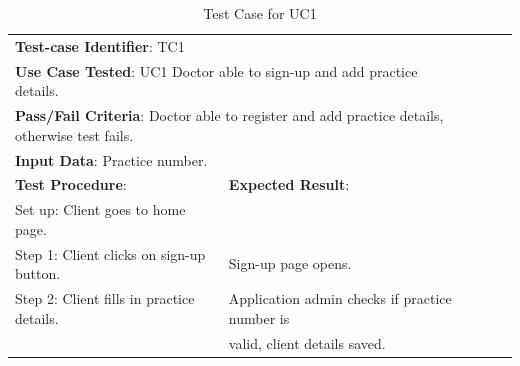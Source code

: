 \documentclass[a4paper]{article}
\begin{document}
\begin{table}[h!]
\centering
\caption*{Test Case for UC1}
\label{TC1}
\begin{tabular}{lllll}
\cline{1-2}

\multicolumn{2}{|l|}{\textbf{Test-case Identifier}: TC1}  &  &  &  \\

\multicolumn{2}{|l|}{\textbf{Use Case Tested}: UC1 Doctor able to sign-up and add practice details.}  &  &  &  \\

\multicolumn{2}{|l|}{\textbf{Pass/Fail Criteria}: Doctor able to register and add practice details, otherwise test fails.}  &  &  &  \\

\multicolumn{2}{|l|}{\textbf{Input Data}: Practice number.}  &  &  &  \\

\cline{1-2}

\multicolumn{1}{|l|}{\textbf{Test Procedure}:} & \multicolumn{1}{l|}{\textbf{Expected Result}:} &  &  &  \\ 

\cline{1-2}

\multicolumn{1}{|l|}{Set up: Client goes to home page.} & \multicolumn{1}{l|}{} &  &  &  \\

\multicolumn{1}{|l|}{Step 1: Client clicks on sign-up button.} & \multicolumn{1}{l|}{Sign-up page opens.} &  &  &  \\

\multicolumn{1}{|l|}{Step 2: Client fills in practice details.} & \multicolumn{1}{l|}{Application admin checks if practice number is} &  &  &  \\

\multicolumn{1}{|l|}{} & \multicolumn{1}{l|}{valid, client details saved.} &  &  &  \\

\cline{1-2}

\end{tabular}
\end{table}

\FloatBarrier
\end{document}
